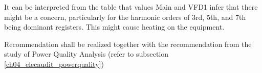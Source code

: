 It can be interpreted from the table that values Main and VFD1 infer that there might be a concern, particularly for the harmonic orders of 3rd, 5th, and 7th being dominant registers. This might cause heating on the equipment.

Recommendation shall be realized together with the recommendation from the study of Power Quality Analysis (refer to subsection \ref{ch04_elecaudit_powerquality})



